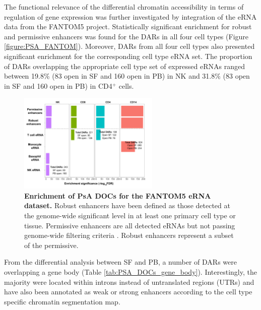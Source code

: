 The functional relevance of the differential chromatin accessibility in terms of regulation of gene expression was further investigated by integration of the eRNA data from the FANTOM5 project. Statistically significant enrichment for robust and permissive enhancers was found for the DARs in all four cell types (Figure \ref{figure:PSA_FANTOM}).  Moreover, DARs from all four cell types also presented significant enrichment for the corresponding cell type eRNA set. The proportion of DARs overlapping the appropriate cell type set of expressed eRNAs ranged between 19.8\% (83 open in SF and 160 open in PB) in NK and 31.8\% (83 open in SF and 160 open in PB) in CD4$^+$ cells.


\begin{figure}[htbp]
\centering
\includegraphics[width=0.6\textwidth]{./Results3/pdfs/ATAC_PsA_FANTOM_enhancer_enrichment_all_cell_types}
\caption[Enrichment of PsA DARs for the FANTOM5 eRNA dataset.]{\textbf{Enrichment of PsA DOCs for the FANTOM5 eRNA dataset.} Robust enhancers have been defined as those detected at the genome-wide significant level in at least one primary cell type or tissue. Permissive enhancers are all detected eRNAs but not passing genome-wide filtering criteria \parencite{Andersson2014}. Robust enhancers represent a subset of the permissive.}
\label{fig:PSA_FANTOM}
\end{figure}

From the differential analysis between SF and PB, a number of DARs were overlapping a gene body (Table \ref{tab:PSA_DOCs_gene_body}). Interestingly, the majority were located within introns instead of untranslated regions (UTRs) and have also been annotated as weak or strong enhancers according to the cell type specific chromatin segmentation map. 


